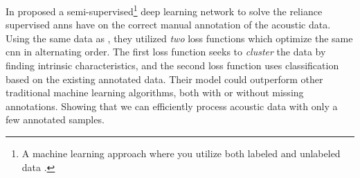 In \citeyear{semtantic-segm2021choi} \citet{semtantic-segm2021choi} proposed  a semi-supervised\footnote{A machine learning approach where you utilize both labeled and unlabeled data \cite{Goodfellow-et-al-2016}.} deep learning network to solve the reliance supervised \gls{ann}s have on the correct manual annotation of the acoustic data. Using the same data as \citet{brautaset2020acoustic}, they utilized \textit{two} loss functions which optimize the same \gls{cnn} in alternating order. The first loss function seeks to \textit{cluster} the data by finding intrinsic characteristics, and the second loss function uses classification based on the existing annotated data. Their model could outperform other traditional machine learning algorithms, both with or without missing annotations. Showing that we can efficiently process acoustic data with only a few annotated samples.




%        









        
        
        
        
        

        
        
        
        
        
        
 


